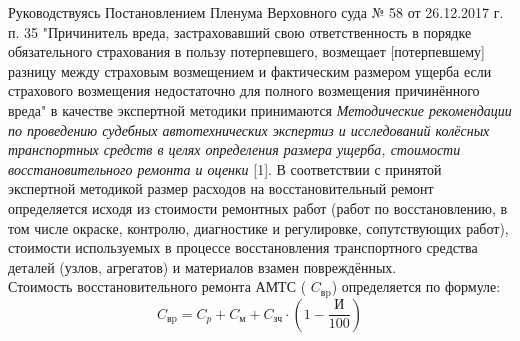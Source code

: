 %
%
%
%
%
%
\par Руководствуясь Постановлением Пленума Верховного суда № 58 от 26.12.2017 г. п. 35 "Причинитель вреда, застраховавший свою ответственность в порядке обязательного страхования в пользу потерпевшего, возмещает [потерпевшему] разницу между страховым возмещением и фактическим размером ущерба если страхового возмещения недостаточно для полного возмещения причинённого вреда"  в качестве экспертной методики принимаются \emph{Методические рекомендации по проведению судебных автотехнических экспертиз и исследований колёсных транспортных средств в целях определения размера ущерба, стоимости восстановительного ремонта и оценки} [1].
В соответствии с принятой экспертной методикой размер расходов на восстановительный ремонт определяется исходя из стоимости ремонтных работ (работ по восстановлению, в том числе окраске, контролю, диагностике и регулировке, сопутствующих работ), стоимости используемых в процессе восстановления транспортного средства деталей (узлов, агрегатов) и материалов взамен повреждённых.\\
%                                         
Стоимость восстановительного ремонта АМТС ( $ C_\text{вp} $) определяется по формуле:
%
\begin{equation}\label{eq:r}
C_\text{вp} =C_p + C_\text{м} + C_\text{зч}\cdot\left(1-\dfrac{ \text{И}}{100} \right) 
\end{equation}
